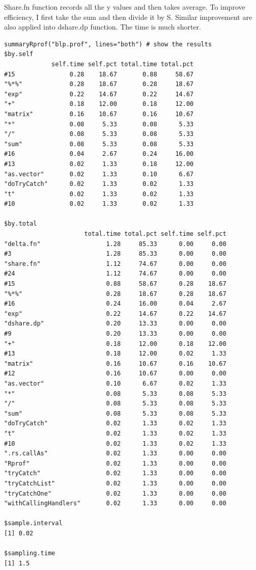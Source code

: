 \documentclass[12pt]{article}
\begin{document}
Share.fn function records all the y values and then takes average. To improve efficiency, I first take the sum and then divide it by S. Similar improvement are also applied into dshare.dp function. The time is much shorter. 
\begin{verbatim}
summaryRprof("blp.prof", lines="both") # show the results
$by.self
             self.time self.pct total.time total.pct
#15               0.28    18.67       0.88     58.67
"%*%"             0.28    18.67       0.28     18.67
"exp"             0.22    14.67       0.22     14.67
"+"               0.18    12.00       0.18     12.00
"matrix"          0.16    10.67       0.16     10.67
"*"               0.08     5.33       0.08      5.33
"/"               0.08     5.33       0.08      5.33
"sum"             0.08     5.33       0.08      5.33
#16               0.04     2.67       0.24     16.00
#13               0.02     1.33       0.18     12.00
"as.vector"       0.02     1.33       0.10      6.67
"doTryCatch"      0.02     1.33       0.02      1.33
"t"               0.02     1.33       0.02      1.33
#10               0.02     1.33       0.02      1.33

$by.total
                      total.time total.pct self.time self.pct
"delta.fn"                  1.28     85.33      0.00     0.00
#3                          1.28     85.33      0.00     0.00
"share.fn"                  1.12     74.67      0.00     0.00
#24                         1.12     74.67      0.00     0.00
#15                         0.88     58.67      0.28    18.67
"%*%"                       0.28     18.67      0.28    18.67
#16                         0.24     16.00      0.04     2.67
"exp"                       0.22     14.67      0.22    14.67
"dshare.dp"                 0.20     13.33      0.00     0.00
#9                          0.20     13.33      0.00     0.00
"+"                         0.18     12.00      0.18    12.00
#13                         0.18     12.00      0.02     1.33
"matrix"                    0.16     10.67      0.16    10.67
#12                         0.16     10.67      0.00     0.00
"as.vector"                 0.10      6.67      0.02     1.33
"*"                         0.08      5.33      0.08     5.33
"/"                         0.08      5.33      0.08     5.33
"sum"                       0.08      5.33      0.08     5.33
"doTryCatch"                0.02      1.33      0.02     1.33
"t"                         0.02      1.33      0.02     1.33
#10                         0.02      1.33      0.02     1.33
".rs.callAs"                0.02      1.33      0.00     0.00
"Rprof"                     0.02      1.33      0.00     0.00
"tryCatch"                  0.02      1.33      0.00     0.00
"tryCatchList"              0.02      1.33      0.00     0.00
"tryCatchOne"               0.02      1.33      0.00     0.00
"withCallingHandlers"       0.02      1.33      0.00     0.00

$sample.interval
[1] 0.02

$sampling.time
[1] 1.5
\end{verbatim}        
\end{document}
